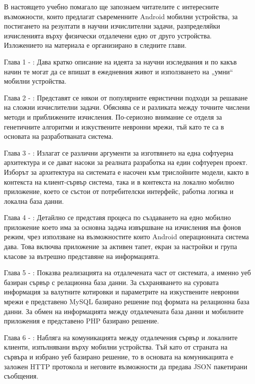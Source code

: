 \documentclass[book,14pt,oneside,openany]{memoir}
\begin{document}
В настоящето учебно помагало ще запознаем читателите с интересните възможности, които предлагат съвременните Android мобилни устройства, за постигането на резултати в научни изчислителни задачи, разпределяйки изчисленията върху физически отдалечени едно от друго устройства. Изложението на материала е организирано в следните глави. 

Глава 1 - : Дава кратко описание на идеята за научни изследвания и по какъв начин те могат да се впишат в ежедневния живот и използването на „умни“ мобилни устройства.

Глава 2 - : Представят се някои от популярните евристични подходи за решаване на сложни изчислителни задачи. Обяснява се и разликата между точните числени методи и приближените изчисления. По-сериозно внимание се отделя за генетичните алгоритми и изкуствените невронни мрежи, тъй като те са в основата на разработваната система. 

Глава 3 - : Излагат се различни аргументи за изготвянето на една софтуерна архитектура и се дават насоки за реалната разработка на един софтуерен проект. Изборът за архитектура на системата е насочен към трислойните модели, както в контекста на клиент-сървър система, така и в контекста на локално мобилно приложение, което се състои от потребителски интерфейс, работна логика и локална база данни. 

Глава 4 - : Детайлно се представя процеса по създаването на едно мобилно приложение което има за основна задача извършване на изчисления във фонов режим, чрез използване на възможностите които Android операционната система дава. Това включва приложение за активен тапет, екран за настройки и група класове за вътрешно представяне на информацията. 

Глава 5 - : Показва реализацията на отдалечената част от системата, а именно уеб базиран сървър с релационна база данни. За съхраняването на суровата информация за валутните котировки и параметрите на изкуствените невронни мрежи е представено MySQL базирано решение под формата на релационна база данни. За обмен на информацията между отдалечената база данни и мобилните приложения е представено PHP базирано решение. 

Глава 6 - : Набляга на комуникацията между отдалечения сървър и локалните клиенти, изпълнявани върху мобилни устройства. Тъй като от страната на сървъра и избрано уеб базирано решение, то в основата на комуникацията е заложен HTTP протокола и неговите възможности да предава JSON пакетирани съобщения. 
\end{document}
